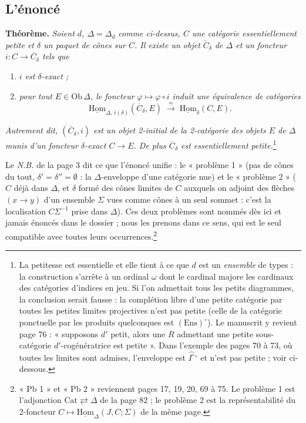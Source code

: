 \documentclass[11pt,a4paper]{article}
\begin{document}
\subsection*{L'énoncé}

\textbf{Théorème.} \emph{Soient $d$, $\Delta = \Delta_{d}$ comme ci-dessus,
$C$ une catégorie essentiellement petite et $\delta$ un paquet de cônes sur
$C$. Il existe un objet $\overline{C}_{\delta}$ de $\Delta$ et un foncteur
$i : C \to \overline{C}_{\delta}$ tels que}
\begin{enumerate}
\item[a)] \emph{$i$ est $\delta$-exact ;}
\item[b)] \emph{pour tout $E \in \mathrm{Ob}\,\Delta$, le foncteur
$\varphi \mapsto \varphi \circ i$ induit une équivalence de catégories}
\[
\underline{\mathrm{Hom}}_{\Delta,\, i(\delta)}(\overline{C}_{\delta}, E)
\;\xrightarrow{\ \approx\ }\;
\underline{\mathrm{Hom}}_{\delta}(C, E).
\]
\end{enumerate}
\emph{Autrement dit, $(\overline{C}_{\delta}, i)$ est un objet 2-initial de
la 2-catégorie des objets $E$ de $\Delta$ munis d'un foncteur $\delta$-exact
$C \to E$. De plus $\overline{C}_{\delta}$ est essentiellement
petite.}\footnote{La petitesse est essentielle et elle tient à ce que $d$ est
un \emph{ensemble} de types : la construction s'arrête à un ordinal
$\omega$ dont le cardinal majore les cardinaux des catégories d'indices en
jeu. Si l'on admettait tous les petits diagrammes, la conclusion serait
fausse : la complétion libre d'une petite catégorie par toutes les petites
limites projectives n'est pas petite (celle de la catégorie ponctuelle par
les produits quelconques est $(\mathrm{Ens})^{\circ}$). Le manuscrit y
revient page 76 : « supposons $d'$ petit, alors une $R$ admettant une petite
sous-catégorie $d'$-cogénératrice est petite ». Dans l'exemple des pages 70
à 73, où toutes les limites sont admises, l'enveloppe est
$\widehat{I^{\circ}}{}^{\circ}$ et n'est pas petite ; voir ci-dessous.}

Le \emph{N.B.} de la page 3 dit ce que l'énoncé unifie : le « problème 1 »
(pas de cônes du tout, $\delta' = \delta'' = \emptyset$ : la
$\Delta$-enveloppe d'une catégorie nue) et le « problème 2 » ($C$ déjà dans
$\Delta$, et $\delta$ formé des cônes limites de $C$ auxquels on adjoint des
flèches $(x \to y)$ d'un ensemble $\Sigma$ vues comme cônes à un seul
sommet : c'est la localisation $C\Sigma^{-1}$ prise dans $\Delta$). Ces deux
problèmes sont nommés dès ici et jamais énoncés dans le dossier ; nous les
prenons dans ce sens, qui est le seul compatible avec toutes leurs
occurrences.\footnote{« Pb 1 » et « Pb 2 » reviennent pages 17, 19, 20, 69
à 75. Le problème 1 est l'adjonction $\mathrm{Cat} \rightleftarrows \Delta$
de la page 82 ; le problème 2 est la représentabilité du 2-foncteur
$C \mapsto \underline{\mathrm{Hom}}_{\Delta}(J, C; \Sigma)$ de la même
page.}
\end{document}
